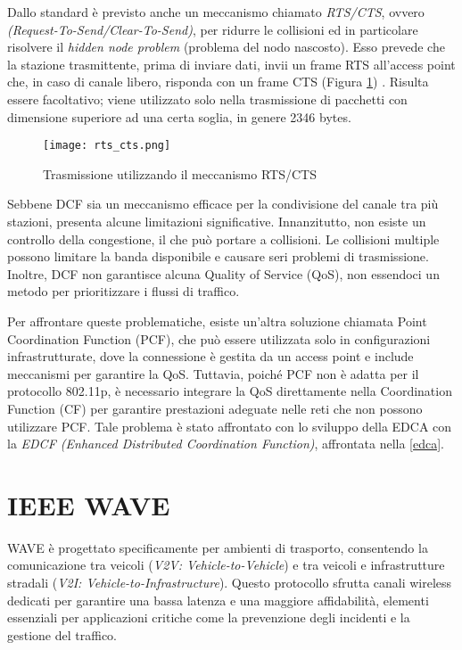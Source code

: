 Dallo standard è previsto anche un meccanismo chiamato \textit{RTS/CTS}, ovvero \textit{(Request-To-Send/Clear-To-Send)}, per ridurre le collisioni ed in particolare risolvere il \textit{hidden node problem} (problema del nodo nascosto). Esso prevede che la stazione trasmittente, prima di inviare dati, invii un frame RTS all'access point che, in caso di canale libero, risponda con un frame CTS (Figura \ref{fig:rts_cts}) \cite{rts}. Risulta essere facoltativo; viene utilizzato solo nella trasmissione di pacchetti con dimensione superiore ad una certa soglia, in genere 2346 bytes.

\begin{figure}[h!]
    \centering
    \texttt{[image: rts\_cts.png]}
    \caption{Trasmissione utilizzando il meccanismo RTS/CTS}
    \label{fig:rts_cts}
\end{figure}

Sebbene DCF sia un meccanismo efficace per la condivisione del canale tra più stazioni, presenta alcune limitazioni significative. Innanzitutto, non esiste un controllo della congestione, il che può portare a collisioni. Le collisioni multiple possono limitare la banda disponibile e causare seri problemi di trasmissione. Inoltre, DCF non garantisce alcuna Quality of Service (QoS), non essendoci un metodo per prioritizzare i flussi di traffico.

Per affrontare queste problematiche, esiste un'altra soluzione chiamata Point Coordination Function (PCF), che può essere utilizzata solo in configurazioni infrastrutturate, dove la connessione è gestita da un access point e include meccanismi per garantire la QoS. Tuttavia, poiché PCF non è adatta per il protocollo 802.11p, è necessario integrare la QoS direttamente nella Coordination Function (CF) per garantire prestazioni adeguate nelle reti che non possono utilizzare PCF. Tale problema è stato affrontato con lo sviluppo della EDCA con la \textit{EDCF (Enhanced Distributed Coordination Function)}, affrontata nella \autoref{edca}.

\section{IEEE WAVE}
\label{wave}
WAVE è progettato specificamente per ambienti di trasporto, consentendo la comunicazione tra veicoli (\textit{V2V: Vehicle-to-Vehicle}) e tra veicoli e infrastrutture stradali (\textit{V2I: Vehicle-to-Infrastructure}). Questo protocollo sfrutta canali wireless dedicati per garantire una bassa latenza e una maggiore affidabilità, elementi essenziali per applicazioni critiche come la prevenzione degli incidenti e la gestione del traffico. 

